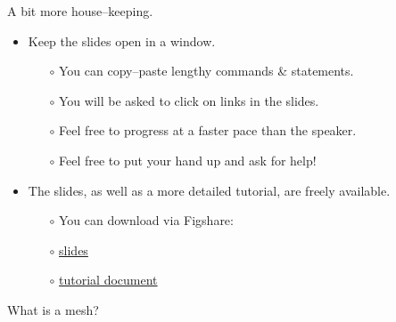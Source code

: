 \documentclass[t]{beamer}
\begin{document}
\begin{frame}{A bit more house--keeping.}
  \begin{itemize}
     \item Keep the slides open in a window.
     \begin{itemize}
         \item[$\circ$] You can copy--paste lengthy commands \& statements.
         \item[$\circ$] You will be asked to click on links in the slides.
         \item[$\circ$] Feel free to progress at a faster pace than the speaker.
         \item[$\circ$] Feel free to put your hand up and ask for help!
     \end{itemize}
     \vspace{10pt}
     \item The slides, as well as a more detailed tutorial, are freely available.\\
     \begin{itemize}
         \item[$\circ$] You can download via Figshare:
         \item[$\circ$] \href{http://figshare.com/s/0dbd16a2635b11e4a71206ec4b8d1f61}{slides}
         \item[$\circ$] \url{tutorial document}
     \end{itemize}
  \end{itemize}
\end{frame}

\begin{frame}{What is a mesh?}
\end{frame}
\end{document}
